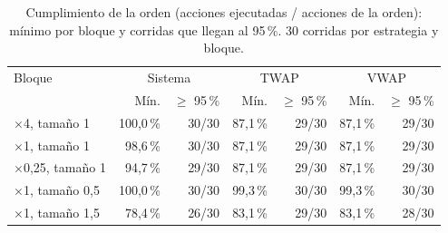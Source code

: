 \begin{table}[htbp]
\centering
\small
\caption{Cumplimiento de la orden (acciones ejecutadas / acciones de la orden): mínimo por bloque y corridas que llegan al 95\,\%. 30 corridas por estrategia y bloque.}
\label{tab:cumplimiento}
\begin{tabular}{lrrrrrr}
\hline
Bloque & \multicolumn{2}{c}{Sistema} & \multicolumn{2}{c}{TWAP} & \multicolumn{2}{c}{VWAP} \\
 & Mín. & $\geq$ 95\,\% & Mín. & $\geq$ 95\,\% & Mín. & $\geq$ 95\,\% \\
\hline
$\times$4, tamaño 1 & 100,0\,\% & 30/30 & 87,1\,\% & 29/30 & 87,1\,\% & 29/30 \\
$\times$1, tamaño 1 & 98,6\,\% & 30/30 & 87,1\,\% & 29/30 & 87,1\,\% & 29/30 \\
$\times$0,25, tamaño 1 & 94,7\,\% & 29/30 & 87,1\,\% & 29/30 & 87,1\,\% & 29/30 \\
$\times$1, tamaño 0,5 & 100,0\,\% & 30/30 & 99,3\,\% & 30/30 & 99,3\,\% & 30/30 \\
$\times$1, tamaño 1,5 & 78,4\,\% & 26/30 & 83,1\,\% & 29/30 & 83,1\,\% & 28/30 \\
\hline
\end{tabular}
\end{table}
